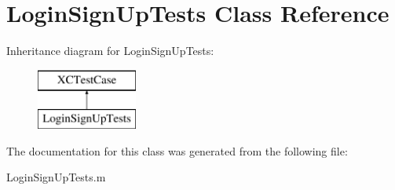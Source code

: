 \hypertarget{interface_login_sign_up_tests}{\section{Login\+Sign\+Up\+Tests Class Reference}
\label{interface_login_sign_up_tests}
}
Inheritance diagram for Login\+Sign\+Up\+Tests\+:\begin{figure}[H]
\begin{center}
\leavevmode
\includegraphics[height=2.000000cm]{interface_login_sign_up_tests}
\end{center}
\end{figure}


The documentation for this class was generated from the following file\+:\begin{DoxyCompactItemize}
\item 
Login\+Sign\+Up\+Tests.\+m\end{DoxyCompactItemize}
